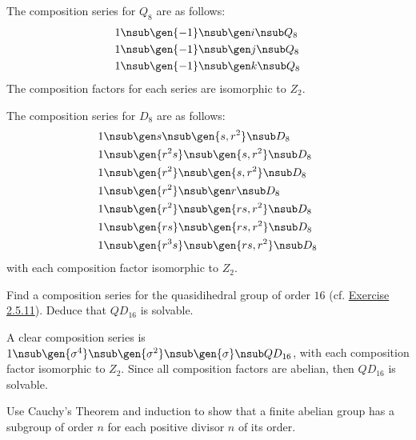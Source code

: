 \begin{sol}
    The composition series for $Q_8$ are as follows:
    \begin{align*}
        1 & \nsub \gen{-1} \nsub \gen i \nsub Q_8 \\
        1 & \nsub \gen{-1} \nsub \gen j \nsub Q_8 \\
        1 & \nsub \gen{-1} \nsub \gen k \nsub Q_8
    \end{align*}
    The composition factors for each series are isomorphic to $Z_2$.

    The composition series for $D_8$ are as follows:
    \begin{align*}
        1 & \nsub \gen s \nsub \gen{s, r^2} \nsub D_8 \\
        1 & \nsub \gen{r^2s} \nsub \gen{s, r^2} \nsub D_8 \\
        1 & \nsub \gen{r^2} \nsub \gen{s, r^2} \nsub D_8 \\
        1 & \nsub \gen{r^2} \nsub \gen r \nsub D_8 \\
        1 & \nsub \gen{r^2} \nsub \gen{rs, r^2} \nsub D_8 \\
        1 & \nsub \gen{rs} \nsub \gen{rs, r^2} \nsub D_8 \\
        1 & \nsub \gen{r^3s} \nsub \gen{rs, r^2} \nsub D_8
    \end{align*}
    with each composition factor isomorphic to $Z_2$.
\end{sol}

\begin{exercise}\label{ex3.4.3}
    Find a composition series for the quasidihedral group of order $16$ (cf. \hyperref[ex2.5.11]{Exercise 2.5.11}). Deduce that $QD_{16}$ is solvable.
\end{exercise}

\begin{sol}
    A clear composition series is $1 \nsub \gen{\sigma^4} \nsub \gen{\sigma^2} \nsub \gen{\sigma} \nsub QD_{16}$, with each composition factor isomorphic to $Z_2$. Since all composition factors are abelian, then $QD_{16}$ is solvable.
\end{sol}

\newpage

\begin{exercise}\label{ex3.4.4}
    Use Cauchy's Theorem and induction to show that a finite abelian group has a subgroup of order $n$ for each positive divisor $n$ of its order.
\end{exercise}

